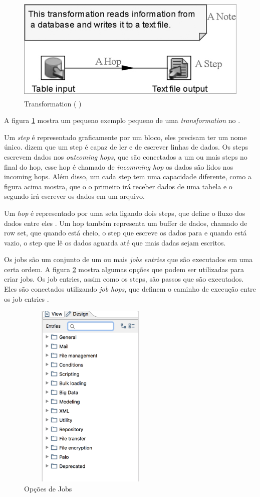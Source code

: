 \begin{figure}[H]
\centering
\includegraphics[height=5cm]{imagens/transformation.png}
\caption{Transformation (\citeauthor{kettle} \citeyear{kettle})}
\label{transformation}
\end{figure}

A figura \ref{transformation} mostra um pequeno exemplo pequeno de uma \textit{transformation} no \pdi.

Um \textit{step} é representado graficamente por um bloco, eles precisam ter um nome único.  dizem que um step é capaz de ler e de escrever linhas de dados. Os steps escrevem dados nos \textit{outcoming hops}, que são conectados a um ou mais steps no final do hop, esse hop é chamado de \textit{incomming hop} os dados são lidos nos incoming hops. Além disso, um cada step tem uma capacidade diferente, como a figura acima mostra, que o o primeiro irá receber dados de uma tabela e o segundo irá escrever os dados em um arquivo.

Um \textit{hop} é representado por uma seta ligando dois steps, que define o fluxo dos dados entre eles \citep{kettle}. Um hop também representa um buffer de dados, chamado de row set, que quando está cheio, o step que escreve os dados para e quando está vazio, o step que lê os dados aguarda até que mais dadas sejam escritos.

Os jobs são um conjunto de um ou mais \textit{jobs entries} que são executados em uma certa ordem. A figura \ref{jobsOptions} mostra algumas opções que podem ser utilizadas para criar jobs. Os job entries, assim como os steps, são passos que são executados. Eles são conectados utilizando \textit{job hops}, que definem o caminho de execução entre os job entries \citep{kettle}.
\begin{figure}[H]
\centering
\includegraphics[width=7cm, height=9cm]{imagens/opcoes_de_jobs.png}
\caption{Opções de Jobs}
\label{jobsOptions}
\end{figure}
